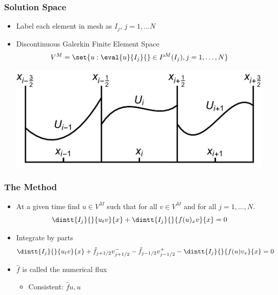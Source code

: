 \documentclass[10pt]{beamer}
\begin{document}
  \begin{frame}
    \frametitle{Solution Space}
    \begin{itemize}
      \item Label each element in mesh as $I_j$, $j = 1, \ldots N$
      \item Discontinuous Galerkin Finite Element Space
        \[
          V^M = \set{u: \eval{u}{I_j}{} \in P^M(I_j), j = 1, \ldots, N}
        \]

        \includegraphics[scale=0.35]{Figures/DG.pdf}
    \end{itemize}
  \end{frame}

  \begin{frame}
    \frametitle{The Method}
    \begin{itemize}
      \item At a given time find $u \in V^M$ such that for all $v \in V^M$ and for all $j = 1, \ldots, N$.
        \[
          \dintt{I_j}{}{u_t v}{x} + \dintt{I_j}{}{f(u)_x v}{x} = 0
        \]

      \item Integrate by parts
        \[
          \dintt{I_j}{}{u_t v}{x} + \hat{f}_{j+1/2} v^-_{j+1/2} - \hat{f}_{j-1/2} v^+_{j-1/2} - \dintt{I_j}{}{f(u) v_x}{x} = 0
        \]

      \item $\hat{f}$ is called the numerical flux
        \begin{itemize}
          \item Consistent: $\hat{f}{u, u}$
        \end{itemize}
    \end{itemize}
  \end{frame}
\end{document}
